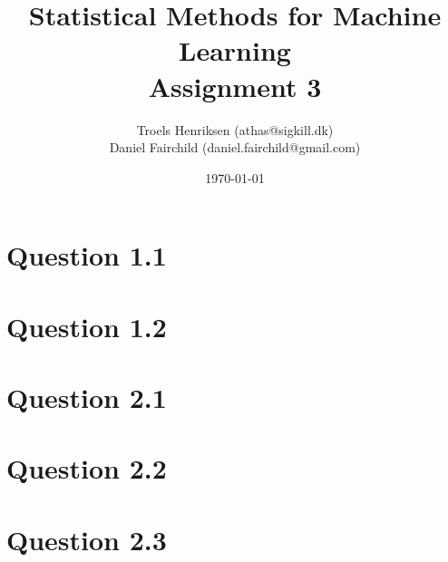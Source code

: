 \documentclass[a4paper, oneside, final]{memoir}
\title{Statistical Methods for Machine Learning\\Assignment 3}
\author{Troels Henriksen (athas@sigkill.dk) \\ Daniel Fairchild
  (daniel.fairchild@gmail.com)}
\date{\today}
\begin{document}
\maketitle
\section*{Question 1.1}

\section*{Question 1.2}


\section*{Question 2.1}


\section*{Question 2.2}


\section*{Question 2.3}

\end{document}
